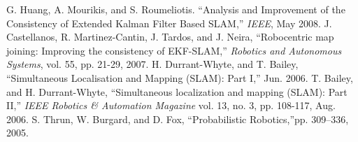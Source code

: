 \documentclass[conference]{IEEEtran}
\begin{document}
\begin{thebibliography}{00}
 G. Huang, A. Mourikis, and S. Roumeliotis. ``Analysis and Improvement of the Consistency of Extended Kalman Filter Based SLAM,'' \textit{IEEE}, May 2008.
 J. Castellanos, R. Martinez-Cantin, J. Tardos, and J. Neira, ``Robocentric map joining: Improving the consistency of EKF-SLAM,'' \textit{Robotics and Autonomous Systems}, vol. 55, pp. 21-29, 2007.
 H. Durrant-Whyte, and T. Bailey, ``Simultaneous Localisation and Mapping (SLAM): Part I,'' Jun. 2006.
 T. Bailey, and H. Durrant-Whyte, ``Simultaneous localization and mapping (SLAM): Part II,'' \textit{IEEE Robotics \& Automation Magazine} vol. 13, no. 3, pp. 108-117, Aug. 2006.
 S. Thrun, W. Burgard, and D. Fox, ``Probabilistic Robotics,''pp. 309--336, 2005.
\end{thebibliography}
\end{document}
